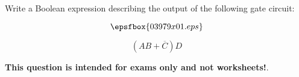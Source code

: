 

Write a Boolean expression describing the output of the following gate circuit:

$$\epsfbox{03979x01.eps}$$







$$\left( AB + \overline{C} \right) D$$







{\bf This question is intended for exams only and not worksheets!}.




